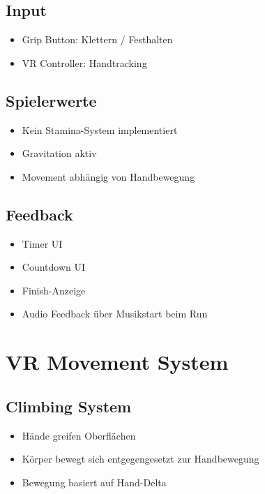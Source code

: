 \documentclass[11pt,a4paper]{article}
\begin{document}
\subsection{Input}

\begin{itemize}
    \item Grip Button: Klettern / Festhalten
    \item VR Controller: Handtracking
\end{itemize}

\subsection{Spielerwerte}

\begin{itemize}
    \item Kein Stamina-System implementiert
    \item Gravitation aktiv
    \item Movement abhängig von Handbewegung
\end{itemize}

\subsection{Feedback}

\begin{itemize}
    \item Timer UI
    \item Countdown UI
    \item Finish-Anzeige
    \item Audio Feedback über Musikstart beim Run
\end{itemize}

\section{VR Movement System}

\subsection{Climbing System}

\begin{itemize}
    \item Hände greifen Oberflächen
    \item Körper bewegt sich entgegengesetzt zur Handbewegung
    \item Bewegung basiert auf Hand-Delta
\end{itemize}
\end{document}
